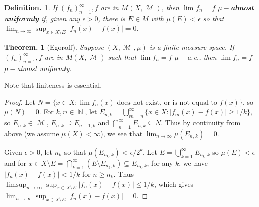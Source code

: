 \documentclass[11pt, a4paper]{memoir}
\DeclareMathOperator{\N}{{\mathbb{N}}}
\theoremstyle{change}
\newtheorem{theorem}{Theorem.}[section]
\theoremstyle{plain}
\theoremstyle{nonumberplain}
\newtheorem{definition}{Definition.}
\newtheorem{proof}{Proof}
\DeclareMathOperator{\M}{{\mathcal{M}}}
\numberwithin{equation}{section}
\begin{document}
\begin{definition}
    If $(f_n)_{n=1}^\infty,f$ are in $M(X,\M)$, then $\lim f_n=f$ \textbf{$\mu-$almost uniformly} if, given any $\epsilon>0$, there is $E\in M$ with $\mu(E)<\epsilon$ so that $\lim_{n\to\infty}\sup_{x\in X\setminus E}|f_n(x)-f(x)|=0$.
\end{definition}
\begin{theorem}[Egoroff]
    Suppose $(X,\M,\mu)$ is a finite measure space.
    If $(f_n)_{n=1}^\infty,f$ are in $M(X,\M)$ such that $\lim f_n=f$ $\mu-$a.e., then $\lim f_n=f$ $\mu-$almost uniformly.
\end{theorem}
Note that finiteness is essential.
\begin{proof}
    Let $N=\{x\in X:\lim f_n(x)\text{ does not exist, or is not equal to $f(x)$}\}$, so $\mu(N)=0$.
    For $k,n\in\N$, let $E_{n,k}=\bigcup_{m=n}^\infty\{x\in X:|f_m(x)-f(x)|\geq 1/k\}$, so $E_{n,k}\in\M$, $E_{n,k}\supseteq E_{n+1,k}$ and $\bigcap_{n=1}^\infty E_{n,k}\subseteq N$.
    Thus by continuity from above (we assume $\mu(X)<\infty$), we see that $\lim_{n\to\infty}\mu(E_{n,k})=0$.

    Given $\epsilon>0$, let $n_k$ so that $\mu(E_{n_k,k})<\epsilon/2^k$.
    Let $E=\bigcup_{k=1}^\infty E_{n_k,k}$ so $\mu(E)<\epsilon$ and for $x\in X\setminus E=\bigcap_{k=1}^\infty(E\setminus E_{n_k,k})\subseteq E_{n_k,k}$, for any $k$, we have $|f_n(x)-f(x)|<1/k$ for $n\geq n_k$.
    Thus $\limsup_{n\to\infty}\sup_{x\in X\setminus E}|f_n(x)-f(x)|\leq 1/k$, which gives $\lim_{n\to\infty}\sup_{x\in X\setminus E}|f_n(x)-f(x)|=0$.
\end{proof}
\end{document}
